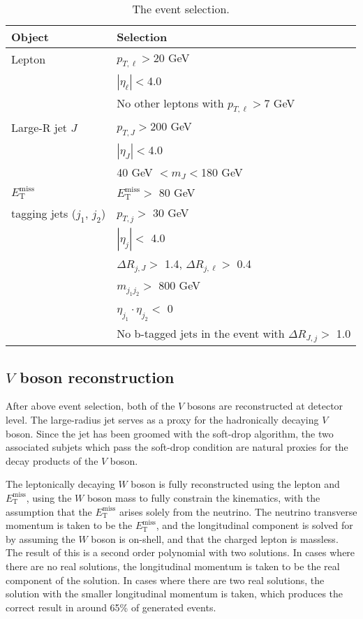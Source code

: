 \documentclass[amsmath,amssymb,aps,prd,preprint,groupedaddress]{revtex4-2}
\begin{document}
\begin{table}[ht]
\centering
\caption{The event selection.}
\label{tab:evsel}
\begin{tabular}[t]{ll}
\hline
Object & Selection\\
\hline
Lepton                       & $p_{T,\ell}>$20 GeV \\
                             & $|\eta_{\ell}|<$4.0 \\
                             & No other leptons with $p_{T,\ell}>$7 GeV  \\
Large-R jet $J$                 & $p_{T,J}>$200 GeV\\
                             & $|\eta_{J}|<$4.0 \\
                             & 40 GeV $< m_{J}<$180 GeV\\
$E_{\text{T}}^{\text{miss}}$ & $E_{\text{T}}^{\text{miss}} >$ 80 GeV\\
tagging jets ($j_{1}$, $j_{2}$)    & $p_{T,j} >$ 30 GeV \\
                             & $|\eta_{j}| <$ 4.0  \\
                             & $\Delta R_{j, J} >$ 1.4, $\Delta R_{j, \ell} >$ 0.4  \\
                             & $m_{j_{1}j_{2}} > $ 800 GeV \\
                             & $\eta_{j_{1}} \cdot \eta_{j_{2}} < $ 0 \\
                             & No b-tagged jets in the event with $\Delta R_{J, j} >$ 1.0 \\
\hline
\end{tabular}
\end{table}



\subsection{$V$ boson reconstruction}
After above event selection, both of the $V$ bosons are reconstructed at detector level.
The large-radius jet serves as a proxy for the hadronically decaying $V$ boson. 
Since the jet has been groomed with the soft-drop algorithm, the two associated subjets which pass the soft-drop condition are natural proxies for the decay products of the $V$ boson. 


The leptonically decaying $W$ boson is fully reconstructed using the lepton and $E_{\text{T}}^{\text{miss}}$, using the $W$ boson mass to fully constrain the kinematics,
with the assumption that the $E_{\text{T}}^{\text{miss}}$ arises solely from the neutrino.
The neutrino transverse momentum is taken to be the $E_{\text{T}}^{\text{miss}}$, and the longitudinal component is solved for by assuming the $W$ boson is on-shell, and that the charged lepton is massless. The result of this is a second order polynomial with two solutions. In cases where there are no real solutions, the longitudinal momentum is taken to be the real component of the solution.
In cases where there are two real solutions, the solution with the smaller longitudinal momentum is taken, which produces the correct result in around 65\% of generated events.
\end{document}
